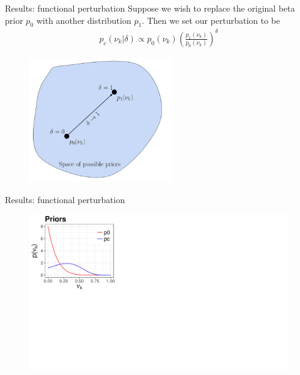 \documentclass[10pt]{beamer}\usepackage[]{graphicx}\usepackage[]{color}
\newenvironment{knitrout}{}{} %
\begin{document}
\begin{frame}{Results: functional perturbation}
Suppose we wish to replace the original beta prior $p_0$ with another distribution $p_1$. Then we set our perturbation to be
\begin{align*}
p_c(\nu_k \vert \delta) \propto p_{0}(\nu_k)\left(\frac{p_1(\nu_k)}{p_0(\nu_k)}\right)^\delta
\end{align*}

\begin{figure}[!h]
\centering
\includegraphics[width = 0.55\textwidth]{./images/functional_perturbation.png}
\setlength{\textfloatsep}{-10pt}
\end{figure}

\end{frame}

\begin{frame}{Results: functional perturbation}
\begin{figure}
\centering
\begin{knitrout}
\color{fgcolor}
{\centering \includegraphics[width=0.98\linewidth,height=0.588\linewidth]{masked_results_fig/func_sens_masked1} 
}
\end{knitrout}
\end{figure}
\end{frame}
\end{document}
